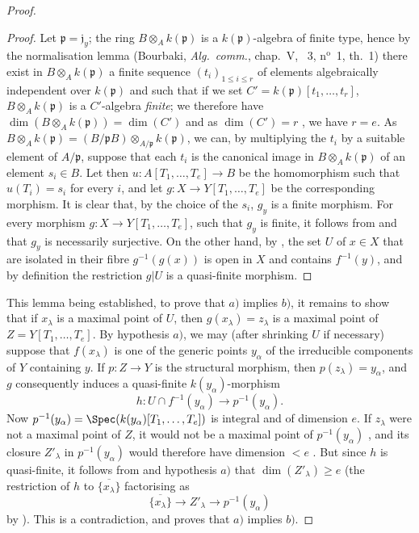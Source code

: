 \begin{proof}
\begin{proof}
Let $\mathfrak{p}=\mathfrak{j}_y$; the ring $B\otimes_A k(\mathfrak{p})$ is a $k(\mathfrak{p})$-algebra of finite type, hence by the normalisation lemma (Bourbaki, \emph{Alg.\ comm.}, chap.~V, \textsection~3, n$^{\text{o}}$~1, th.~1) there exist in $B\otimes_A k(\mathfrak{p})$ a finite sequence $(t_i)_{1\leq i\leq r}$ of elements algebraically independent over $k(\mathfrak{p})$ and such that if we set $C'=k(\mathfrak{p})[t_1,\ldots,t_r]$, $B\otimes_A k(\mathfrak{p})$ is a $C'$-algebra \emph{finite}; we therefore have $\dim(B\otimes_A k(\mathfrak{p}))=\dim(C')$  and as $\dim(C')=r$ , we have $r=e$.
As $B\otimes_A k(\mathfrak{p})=(B/\mathfrak{p}B)\otimes_{A/\mathfrak{p}}k(\mathfrak{p})$, we can, by multiplying the $t_i$ by a suitable
element of $A/\mathfrak{p}$, suppose that each $t_i$ is the canonical image in $B\otimes_A k(\mathfrak{p})$ of an element $s_i\in B$.
Let then $u:A[T_1,\ldots,T_e]\to B$ be the homomorphism such that $u(T_i)=s_i$ for every $i$, and let $g:X\to Y[T_1,\ldots,T_e]$ be the corresponding morphism.
It is clear that, by the choice of the $s_i$, $g_y$ is a finite morphism.
For every morphism $g:X\to Y[T_1,\ldots,T_e]$, such that $g_y$ is finite, it follows from  and  that $g_y$ is necessarily surjective.
On the other hand, by , the set $U$ of $x\in X$ that are isolated in their fibre $g^{-1}(g(x))$ is open in $X$ and contains $f^{-1}(y)$, and by definition the restriction $g|U$ is a quasi-finite morphism.
\end{proof}

This lemma being established, to prove that $a)$ implies $b)$, it remains to show that if $x_\lambda$ is a maximal point of $U$, then $g(x_\lambda)=z_\lambda$ is a maximal point of $Z=Y[T_1,\ldots,T_e]$.
By hypothesis $a)$, we may (after shrinking $U$ if necessary) suppose that $f(x_\lambda)$ is one of the generic points $y_\alpha$ of the irreducible components of $Y$ containing $y$. If $p:Z\to Y$ is the structural morphism, then $p(z_\lambda)=y_\alpha$, and $g$ consequently induces a quasi-finite $k(y_\alpha)$-morphism
\[
h:U\cap f^{-1}(y_\alpha)\longrightarrow p^{-1}(y_\alpha).
\]
Now $p^{-1}(y_\alpha)=\Spec(k(y_\alpha)[T_1,\ldots,T_e])$ is integral and of dimension $e$. If $z_\lambda$ were not a maximal point of $Z$, it would not be a maximal point of $p^{-1}(y_\alpha)$ , and its closure $Z'_\lambda$ in $p^{-1}(y_\alpha)$ would therefore have dimension $<e$ . But since $h$ is quasi-finite, it follows from  and hypothesis $a)$ that $\dim(Z'_\lambda)\geq e$ (the restriction of $h$ to $\overline{\{x_\lambda\}}$ factorising as
\[
\overline{\{x_\lambda\}}\longrightarrow Z'_\lambda\longrightarrow p^{-1}(y_\alpha)
\]
by ). This is a contradiction, and proves that $a)$ implies $b)$.


\end{proof}
